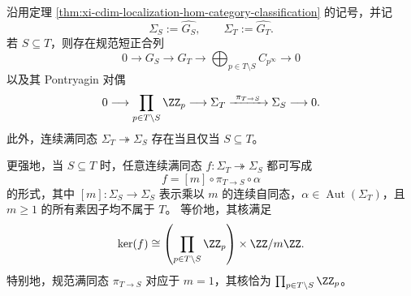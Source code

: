 \begin{theorem}\label{thm:xi-cdim-localization-quotient-solenoid-surjections}
沿用定理 \ref{thm:xi-cdim-localization-hom-category-classification} 的记号，并记
\[
\Sigma_S:=\widehat{G_S},
\qquad
\Sigma_T:=\widehat{G_T}.
\]
若 \(S\subseteq T\)，则存在规范短正合列
\[
0\longrightarrow G_S\longrightarrow G_T
\longrightarrow \bigoplus_{p\in T\setminus S} C_{p^\infty}
\longrightarrow 0
\]
以及其 Pontryagin 对偶
\[
0\longrightarrow \prod_{p\in T\setminus S}\ZZ_p
\longrightarrow \Sigma_T
\xrightarrow{\ \pi_{T\to S}\ }\Sigma_S
\longrightarrow 0.
\]
此外，连续满同态 \(\Sigma_T\twoheadrightarrow \Sigma_S\) 存在当且仅当 \(S\subseteq T\)。

更强地，当 \(S\subseteq T\) 时，任意连续满同态 \(f:\Sigma_T\twoheadrightarrow \Sigma_S\) 都可写成
\[
f=[m]\circ \pi_{T\to S}\circ \alpha
\]
的形式，其中 \([m]:\Sigma_S\to\Sigma_S\) 表示乘以 \(m\) 的连续自同态，\(\alpha\in\operatorname{Aut}(\Sigma_T)\)，且 \(m\ge 1\) 的所有素因子均不属于 \(T\)。
等价地，其核满足
\[
\ker(f)\cong
\left(\prod_{p\in T\setminus S}\ZZ_p\right)\times \ZZ/m\ZZ.
\]
特别地，规范满同态 \(\pi_{T\to S}\) 对应于 \(m=1\)，其核恰为
\(
\prod_{p\in T\setminus S}\ZZ_p
\)。
\end{theorem}
